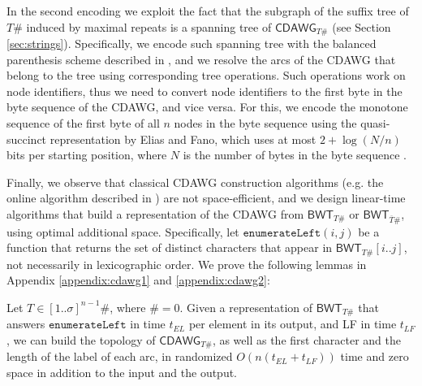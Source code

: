 \documentclass[a4paper,UKenglish]{lipics-v2016}
\newcommand{\REV}[1]{\ensuremath{\overline{#1}}}
\newcommand{\BWT}{\ensuremath{\mathsf{BWT}}}
\newcommand{\CDAWG}{\ensuremath{\mathsf{CDAWG}}}
\begin{document}
In the second encoding we exploit the fact that the subgraph of the suffix tree of $T\#$ induced by maximal repeats is a spanning tree of $\CDAWG_{T\#}$ (see Section \ref{sec:strings}). Specifically, we encode such spanning tree with the balanced parenthesis scheme described in \cite{Munro01}, and we resolve the arcs of the CDAWG that belong to the tree using corresponding tree operations. Such operations work on node identifiers, thus we need to convert node identifiers to the first byte in the byte sequence of the CDAWG, and vice versa. For this, we encode the monotone sequence of the first byte of all $n$ nodes in the byte sequence using the quasi-succinct representation by Elias and Fano, which uses at most $2+\log(N/n)$ bits per starting position, where $N$ is the number of bytes in the byte sequence \cite{elias1975complexity}.

Finally, we observe that classical CDAWG construction algorithms (e.g. the online algorithm described in \cite{CrochemoreV97}) are not space-efficient, and we design linear-time algorithms that build a representation of the CDAWG from $\BWT_{T\#}$ or $\BWT_{\REV{T}\#}$, using optimal additional space. Specifically, let $\mathtt{enumerateLeft}(i,j)$ be a function that returns the set of distinct characters that appear in $\BWT_{T\#}[i..j]$, not necessarily in lexicographic order. We prove the following lemmas in Appendix \ref{appendix:cdawg1} and \ref{appendix:cdawg2}:

\begin{lemma} \label{lemma:cdawg1}
Let $T \in [1..\sigma]^{n-1}\#$, where $\#=0$. Given a representation of $\BWT_{T\#}$ that answers $\mathtt{enumerateLeft}$ in time $t_{EL}$ per element in its output, and LF in time $t_{LF}$, we can build the topology of $\CDAWG_{T\#}$, as well as the first character and the length of the label of each arc, in randomized $O(n(t_{EL}+t_{LF}))$ time and zero space in addition to the input and the output. 
\end{lemma}
\end{document}
